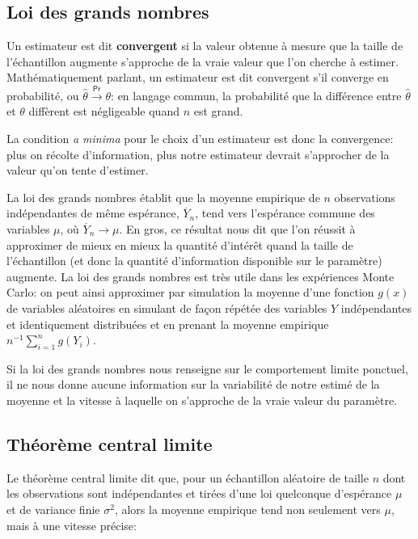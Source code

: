 \documentclass[
  11pt,
  letterpaper,
]{article}
\theoremstyle{definition}
\theoremstyle{definition}
\theoremstyle{definition}
\theoremstyle{definition}
\theoremstyle{remark}
\begin{document}
\hypertarget{loi-grands-nombres}{%
\subsection{Loi des grands nombres}\label{loi-grands-nombres}}

Un estimateur est dit \textbf{convergent} si la valeur obtenue à mesure que la taille de l'échantillon augmente s'approche de la vraie valeur que l'on cherche à estimer. Mathématiquement parlant, un estimateur est dit convergent s'il converge en probabilité, ou \(\hat{\theta} \stackrel{\mathsf{Pr}}{\to} \theta\): en langage commun, la probabilité que la différence entre \(\hat{\theta}\) et \(\theta\) diffèrent est négligeable quand \(n\) est grand.

La condition \emph{a minima} pour le choix d'un estimateur est donc la convergence: plus on récolte d'information, plus notre estimateur devrait s'approcher de la valeur qu'on tente d'estimer.

La loi des grands nombres établit que la moyenne empirique de \(n\) observations indépendantes de même espérance, \(\overline{Y}_n\), tend vers l'espérance commune des variables \(\mu\), où \(\overline{Y}_n \rightarrow \mu\). En gros, ce résultat nous dit que l'on réussit à approximer de mieux en mieux la quantité d'intérêt quand la taille de l'échantillon (et donc la quantité d'information disponible sur le paramètre) augmente. La loi des grands nombres est très utile dans les expériences Monte Carlo: on peut ainsi approximer par simulation la moyenne d'une fonction \(g(x)\) de variables aléatoires en simulant de façon répétée des variables \(Y\) indépendantes et identiquement distribuées et en prenant la moyenne empirique \(n^{-1} \sum_{i=1}^n g(Y_i)\).

Si la loi des grands nombres nous renseigne sur le comportement limite ponctuel, il ne nous donne aucune information sur la variabilité de notre estimé de la moyenne et la vitesse à laquelle on s'approche de la vraie valeur du paramètre.

\hypertarget{TCL}{%
\subsection{Théorème central limite}\label{TCL}}

Le théorème central limite dit que, pour un échantillon aléatoire de taille \(n\) dont les observations sont indépendantes et tirées d'une loi quelconque d'espérance \(\mu\) et de variance finie \(\sigma^2\), alors la moyenne empirique tend non seulement vers \(\mu\), mais à une vitesse précise:
\end{document}
